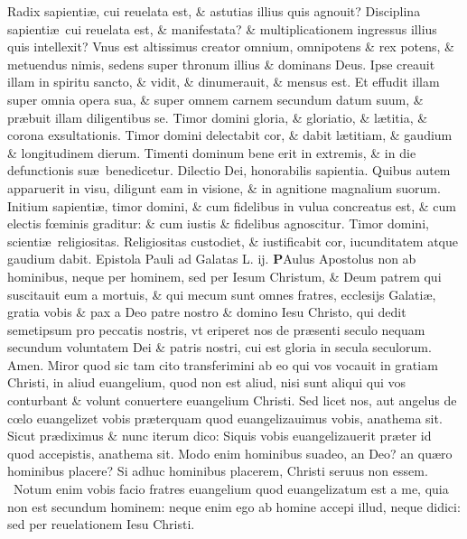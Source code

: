 \documentclass[a5paper,10pt]{book}
\def\leftmarginnote{%
	\lrmarginnote{\hskip -\marginparsep \hskip -6.5em}}
\def\rightmarginnote{%
	\lrmarginnote{\hskip\columnwidth \hskip -1em}}
\def\ae{æ}
\def\oe{œ}
\begin{document}
\begin{multicols*}{2}
Radix sapienti\ae , cui reuelata est, \& astutias illius quis agnouit? Disciplina sapienti\ae \ cui reuelata est, \& manifestata? \& multiplicationem ingressus illius quis intellexit?
Vnus est altissimus creator omnium, omnipotens \& rex potens, \& metuendus nimis, sedens super
thronum illius \& dominans Deus.
Ipse creauit illam in spiritu sancto, \& vidit, \& dinumerauit, \& mensus est. Et effudit illam super omnia opera sua, \& super omnem carnem secundum datum suum, \& pr\ae buit illam diligentibus se.
Timor domini gloria, \& gloriatio, \& l\ae titia, \& corona exsultationis. Timor domini delectabit cor, \& dabit l\ae titiam, \& gaudium \& longitudinem dierum.
Timenti dominum bene erit in extremis, \& in die defunctionis su\ae \ benedicetur. Dilectio Dei, honorabilis sapientia. Quibus autem apparuerit in visu, diligunt eam in visione, \& in agnitione magnalium suorum.
Initium sapienti\ae , timor domini, \& cum fidelibus in vulua concreatus est, \& cum electis f\oe minis graditur: \& cum iustis \& fidelibus agnoscitur.
Timor domini, scienti\ae \ religiositas. Religiositas custodiet, \& iustificabit cor, iucunditatem atque gaudium dabit.
\newline \color{red} Epistola Pauli ad Galatas \hfill L. ij. \color{black}
\vspace{-.25em}
\lettrine[lines=2]{\bfseries \color{red} P}{}Aulus\rightmarginnote{ca. 1.} Apostolus non ab hominibus, neque per hominem, sed per Iesum Christum, \& Deum patrem qui suscitauit eum a mortuis, \& qui mecum sunt omnes fratres, ecclesijs Galati\ae , gratia vobis \& pax a Deo patre nostro \& domino Iesu Christo, qui dedit semetipsum pro peccatis nostris, vt eriperet nos de pr\ae senti seculo nequam secundum voluntatem Dei \& patris nostri, cui est gloria in secula seculorum. Amen.
Miror quod sic tam cito transferimini ab eo qui vos vocauit in gratiam Christi, in aliud euangelium, quod non est aliud, nisi sunt aliqui qui vos conturbant \& volunt conuertere euangelium Christi.
Sed licet nos, aut angelus de c\oe lo euangelizet vobis pr\ae terquam quod euangelizauimus vobis, anathema sit. Sicut pr\ae diximus \& nunc iterum dico: Siquis vobis euangelizauerit pr\ae ter id quod accepistis, anathema sit.
Modo enim hominibus suadeo, an Deo? an qu\ae ro hominibus placere? Si adhuc hominibus placerem, Christi seruus non essem. \textdagger \ 
Notum\leftmarginnote{\begin{flushright}B\end{flushright}} enim vobis facio fratres euangelium quod euangelizatum est a me, quia non est secundum hominem: neque enim ego ab homine accepi illud, neque didici: sed per reuelationem Iesu Christi.

\end{multicols*}
\end{document}
